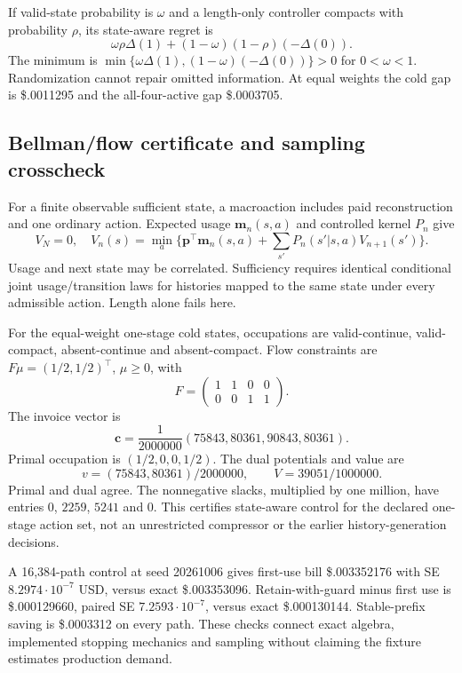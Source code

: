 \documentclass[sigconf,screen,nonacm]{acmart}
\newcommand{\pp}{\boldsymbol{p}}
\newcommand{\Mvec}{\boldsymbol{m}}
\begin{document}
If valid-state probability is $\omega$ and a length-only controller
compacts with probability $\rho$, its state-aware regret is
\begin{equation}
\omega\rho\Delta(1)+(1-\omega)(1-\rho)(-\Delta(0)).
\end{equation}
The minimum is $\min\{\omega\Delta(1),(1-\omega)(-\Delta(0))\}>0$
for $0<\omega<1$. Randomization cannot repair omitted information.
At equal weights the cold gap is \$.0011295 and the all-four-active
gap \$.0003705.

\subsection{Bellman/flow certificate and sampling crosscheck}
For a finite observable sufficient state, a macroaction includes paid
reconstruction and one ordinary action. Expected usage $\Mvec_n(s,a)$
and controlled kernel $P_n$ give
\begin{equation}
V_N=0,\quad V_n(s)=\min_a\{\pp^\top\Mvec_n(s,a)
+\sum_{s'}P_n(s'|s,a)V_{n+1}(s')\}.
\end{equation}
Usage and next state may be correlated. Sufficiency requires identical
conditional joint usage/transition laws for histories mapped to the same
state under every admissible action. Length alone fails here.

For the equal-weight one-stage cold states, occupations are valid-continue,
valid-compact, absent-continue and absent-compact. Flow constraints are
$F\mu=(1/2,1/2)^\top$, $\mu\ge0$, with
\begin{equation}
F=\begin{pmatrix}1&1&0&0\\0&0&1&1\end{pmatrix}.
\end{equation}
The invoice vector is
\begin{equation}
\boldsymbol c=\frac1{2000000}(75843,80361,90843,80361).
\end{equation}
Primal occupation is $(1/2,0,0,1/2)$. The dual potentials and value are
\begin{equation}
v=(75843,80361)/2000000,\qquad V=39051/1000000.
\end{equation}
Primal and dual agree. The nonnegative slacks, multiplied by one
million, have entries $0$, $2259$, $5241$ and $0$.
This certifies state-aware control for the declared one-stage action set,
not an unrestricted compressor or the earlier history-generation decisions.

A 16,384-path control at seed 20261006 gives first-use bill
\$.003352176 with SE $8.2974\cdot10^{-7}$ USD, versus exact
\$.003353096. Retain-with-guard minus first use is \$.000129660,
paired SE $7.2593\cdot10^{-7}$, versus exact \$.000130144.
Stable-prefix saving is \$.0003312 on every path. These checks connect
exact algebra, implemented stopping mechanics and sampling without claiming
the fixture estimates production demand.
\end{document}

